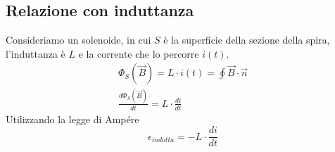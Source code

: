 \subsection{Relazione con induttanza}
Consideriamo un solenoide, in cui $S$ è la superficie della sezione della spira, l'induttanza è $L$ e la corrente che lo percorre $i(t)$. 
\begin{displaymath}\begin{aligned}
	\Phi_S (\vec{B}) = L \cdot i(t) = \oint \vec{B} \cdot \vec{n}\\
    \frac{d\Phi_S (\vec{B})}{dt} = L \cdot \frac{di}{dt}
\end{aligned}\end{displaymath}
Utilizzando la legge di Ampére
\begin{displaymath}
	\epsilon_{indotta} = -L \cdot \frac{di}{dt}
\end{displaymath}